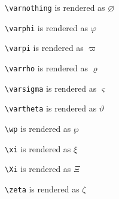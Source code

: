 \texttt{\textbackslash varnothing} is rendered as $\varnothing$


\texttt{\textbackslash varphi} is rendered as $\varphi$


\texttt{\textbackslash varpi} is rendered as $\varpi$


\texttt{\textbackslash varrho} is rendered as $\varrho$


\texttt{\textbackslash varsigma} is rendered as $\varsigma$


\texttt{\textbackslash vartheta} is rendered as $\vartheta$


\texttt{\textbackslash wp} is rendered as $\wp$


\texttt{\textbackslash xi} is rendered as $\xi$


\texttt{\textbackslash Xi} is rendered as $\Xi$


\texttt{\textbackslash zeta} is rendered as $\zeta$

